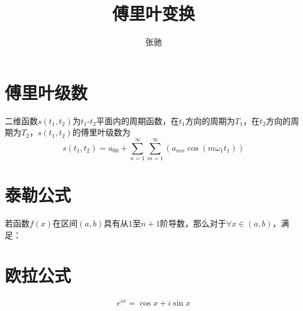 \documentclass[letterpaper,11pt]{article}
\numberwithin{equation}{section}
\begin{document}
\title{傅里叶变换}
\author{张驰}
\maketitle

\section{傅里叶级数}

二维函数$s(t_1,t_2)$为$t_1$-$t_2$平面内的周期函数，在$t_1$方向的周期为$T_1$，在$t_2$方向的周期为$T_2$，$s(t_1,t_2)$的傅里叶级数为
\begin{equation}
    s(t_1,t_2)=a_{00}+\sum_{n=1}^{\infty}\sum_{m=1}^{\infty} \left( a_{mn}\cos(m \omega_1 t_1) \right)
\end{equation}

\section{泰勒公式}

若函数$f(x)$在区间$(a,b)$具有从$1$至$n+1$阶导数，那么对于$\forall x \in (a,b)$，满足：

\section{欧拉公式}

\begin{equation}
    e^{ix}=\cos x + i \sin x
\end{equation}
\end{document}
